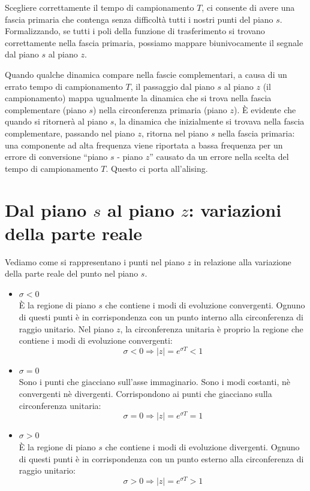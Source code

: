 \documentclass[a4paper]{report}
\begin{document}
Scegliere correttamente il tempo di campionamento $T$, ci consente di
avere una fascia primaria che contenga senza difficolt\`a tutti i
nostri punti del piano $s$. Formalizzando, se tutti i poli della
funzione di trasferimento si trovano correttamente nella fascia
primaria, possiamo mappare biunivocamente il segnale dal piano $s$ al
piano $z$.

Quando qualche dinamica compare nella fascie complementari, a causa di
un errato tempo di campionamento $T$, il passaggio dal piano $s$ al
piano $z$ (il campionamento) mappa ugualmente la dinamica che si trova
nella fascia complementare (piano $s$) nella circonferenza primaria
(piano $z$). \`E evidente che quando si ritorner\`a al piano $s$, la
dinamica che inizialmente si trovava nella fascia complementare,
passando nel piano $z$, ritorna nel piano $s$ nella fascia primaria:
una componente ad alta frequenza viene riportata a bassa frequenza per
un errore di conversione ``piano $s$ - piano $z$'' causato da un
errore nella scelta del tempo di campionamento $T$. Questo ci porta
all'alising.

\section{Dal piano $s$ al piano $z$: variazioni della parte reale}
Vediamo come si rappresentano i punti nel piano $z$ in relazione alla
variazione della parte reale del punto nel piano $s$.
\begin{itemize}
\item $\sigma < 0$\\
  \`E la regione di piano $s$ che contiene i modi di evoluzione
  convergenti. Ognuno di questi punti \`e in corrispondenza con un
  punto interno alla circonferenza di raggio unitario. Nel piano $z$,
  la circonferenza unitaria \`e proprio la regione che contiene i modi
  di evoluzione convergenti:
  \[
  \sigma < 0 \Rightarrow |z| = e^{\sigma T} < 1
  \]
\item $\sigma = 0$\\
  Sono i punti che giacciano sull'asse immaginario. Sono i modi
  costanti, n\`e convergenti n\`e divergenti. Corrispondono ai punti
  che giacciano sulla circonferenza unitaria:
  \[
  \sigma = 0 \Rightarrow |z| = e^{\sigma T} = 1
  \]
\item $\sigma > 0$\\
  \`E la regione di piano $s$ che contiene i modi di evoluzione
  divergenti. Ognuno di questi punti \`e in corrispondenza con un
  punto esterno alla circonferenza di raggio unitario:
  \[
  \sigma > 0 \Rightarrow |z| = e^{\sigma T} > 1
  \]
\end{itemize}
\end{document}
